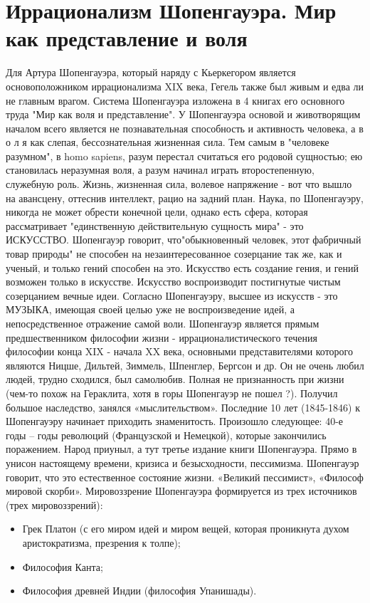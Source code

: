 \documentclass[12pt]{article}
\begin{document}
\section{Иррационализм Шопенгауэра. Мир как представление и воля}
Для Артура Шопенгауэра, который наряду с Кьеркегором является основоположником иррационализма XIX
века, Гегель также был живым и едва ли не главным врагом.
Система Шопенгауэра изложена в 4 книгах его основного труда "Мир как воля и представление".
У Шопенгауэра основой и животворящим началом всего является не познавательная способность и активность
человека, а в о л я как слепая, бессознательная жизненная сила. Тем самым в "человеке разумном", в homo
sapiens, разум перестал считаться его родовой сущностью; ею становилась неразумная воля, а разум начинал
играть второстепенную, служебную роль.
Жизнь, жизненная сила, волевое напряжение - вот что вышло на авансцену, оттеснив интеллект, рацио на
задний план.
Наука, по Шопенгауэру, никогда не может обрести конечной цели, однако есть сфера, которая рассматривает
"единственную действительную сущность мира" - это ИСКУССТВО. Шопенгауэр говорит, что"обыкновенный
человек, этот фабричный товар природы" не способен на незаинтересованное созерцание так же, как и ученый,
и только гений способен на это. Искусство есть создание гения, и гений возможен только в искусстве. Искусство
воспроизводит постигнутые чистым созерцанием вечные идеи.
Согласно Шопенгауэру, высшее из искусств - это МУЗЫКА, имеющая своей целью уже не воспроизведение
идей, а непосредственное отражение самой воли.
Шопенгауэр  является  прямым  предшественником  философии  жизни  -  иррационалистического  течения
философии конца XIX - начала XX века, основными представителями которого являются Ницше, Дильтей,
Зиммель, Шпенглер, Бергсон и др.
Он не очень любил людей, трудно сходился, был самолюбив. Полная не признанность при жизни (чем-то похож
на Гераклита, хотя в горы Шопенгауэр не пошел ?). Получил большое наследство, занялся «мыслительством».
Последние 10 лет (1845-1846) к Шопенгауэру начинает приходить знаменитость. Произошло следующее: 40-е
годы – годы революций (Французской и Немецкой), которые закончились поражением. Народ приуныл, а тут
третье  издание  книги  Шопенгауэра.  Прямо  в  унисон  настоящему  времени,  кризиса  и  безысходности,
пессимизма. Шопенгауэр говорит, что это естественное состояние жизни. «Великий пессимист», «Философ
мировой скорби».  Мировоззрение Шопенгауэра формируется из трех источников (трех мировоззрений):
\begin{itemize}
  \item Грек Платон (с его миром идей и миром вещей, которая проникнута духом аристократизма, презрения к толпе);
\item Философия Канта;
\item Философия древней Индии (философия Упанишады).
\end{itemize}
\end{document}
